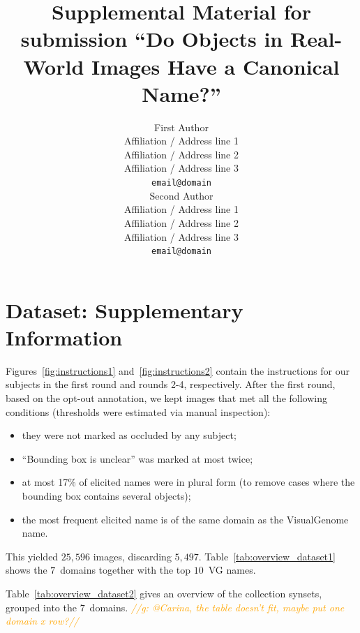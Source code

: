 \documentclass[11pt,a4paper]{article}
\title{Supplemental Material for submission ``Do Objects in Real-World Images Have a Canonical Name?''}
\author{First Author \\
  Affiliation / Address line 1 \\
  Affiliation / Address line 2 \\
  Affiliation / Address line 3 \\
  {\tt email@domain} \\\And
  Second Author \\
  Affiliation / Address line 1 \\
  Affiliation / Address line 2 \\
  Affiliation / Address line 3 \\
  {\tt email@domain} \\}
\date{}
\newcommand{\vgenome}{VisualGenome\xspace}
\newcommand{\gbt}[1]{\textcolor{orange}{\emph{//g: #1//}}}
\begin{document}
\maketitle
\section{Dataset: Supplementary Information}
\label{app:instructions}

Figures~\ref{fig:instructions1} and~\ref{fig:instructions2} contain the instructions for our subjects in the first round and rounds 2-4, respectively.
After the first round, based on the opt-out annotation, we kept images that met all the following conditions (thresholds were estimated via manual inspection):
\begin{itemize}
\item they were not marked as occluded by any subject;
\item ``Bounding box is unclear'' was marked at most twice;
\item at most 17\% of elicited names were in plural form (to remove cases where the bounding box contains several objects);
\item the most frequent elicited name is of the same domain as the \vgenome name.
\end{itemize}
This yielded $25,596$ images, discarding $5,497$.
Table~\ref{tab:overview_dataset1} shows the $7$\ domains together with the top $10$\ VG names.

Table~\ref{tab:overview_dataset2} gives an overview of the collection synsets, grouped into the $7$~domains.
\gbt{@Carina, the table doesn't fit, maybe put one domain x row?}
\end{document}
